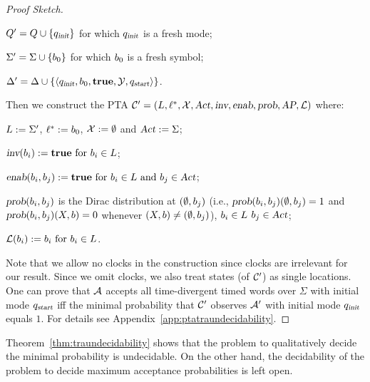 \begin{proof}[Proof Sketch]
\begin{compactitem}
\item $Q'   = Q  \cup \{ q_{\mbox{\sl\scriptsize init} } \}$ for which $q_{\mbox{\sl\scriptsize init} }$ is a fresh mode;
\item $\Sigma'  = \Sigma \cup \{ b_{0} \}$ for which $b_{0}$ is a fresh symbol;
\item $\Delta'     = \Delta    \cup \{ \langle
            q_{\mbox{\sl\scriptsize init} },
            b_{0},
            \mathbf{true},
            \mathcal{Y},
            q_{\mbox{\sl\scriptsize start}}
        \rangle
    \}$.
\end{compactitem}
Then we construct the PTA
$
\mathcal{C}'=\left(L, \ell^*, \mathcal{X}, \mbox{\sl Act}, \mbox{\sl inv}, \mbox{\sl enab},  \mbox{\sl prob}, \mbox{\sl AP}, \mathcal{L}\right)
$
where:
\begin{compactitem}
    \item $L      :=  \Sigma'$, $\ell^*     :=  b_{0} $, $\mathcal{X}    :=  \emptyset $ and $\mbox{\sl Act}      :=  \Sigma $;
    \item $\mbox{\sl inv}(b_{i})              :=  \mathbf{true}
                                            \text{ for }
                                            b_{i} \in L$;
    \item $\mbox{\sl enab}(b_{i},b_{j})   :=  \mathbf{true}
                                            \text{ for }
                                            b_{i} \in L
                                            \text{ and }
                                            b_{j} \in \mbox{\sl Act}$;
    \item $\mbox{\sl prob}(b_{i},b_{j})$ is the Dirac distribution at $(\emptyset,b_{j})$ (i.e., $\mbox{\sl prob}(b_{i},b_{j})(\emptyset,b_{j})=1$ and $\mbox{\sl prob}(b_{i},b_{j})(X,b)=0$ whenever $(X,b)\ne(\emptyset,b_{j})$),
                                            $b_{i} \in L$
                                            $b_{j} \in \mbox{\sl Act}$;
    \item $\mathcal{L}(b_{i})           :=  b_{i}
                                            \text{ for } b_{i} \in L$.
\end{compactitem}
Note that we allow no clocks in the construction since clocks are irrelevant for our result.
Since we omit clocks, we also treat states (of $\mathcal{C}'$) as single locations.
One can prove that $\mathcal{A}$ accepts all time-divergent timed words over $\Sigma$ with initial mode $q_{\mbox{\sl\scriptsize start}}$ iff
the minimal probability that $\mathcal{C}'$ observes $\mathcal{A}'$ with initial mode $q_{\mbox{\sl\scriptsize init} }$ equals $1$.
For details see Appendix~\ref{app:ptatraundecidability}.
\end{proof}

\begin{remark}
Theorem~\ref{thm:traundecidability} shows that the problem to qualitatively decide the minimal probability is undecidable.
On the other hand, the decidability of the problem to decide maximum acceptance probabilities is left open.
\end{remark}
